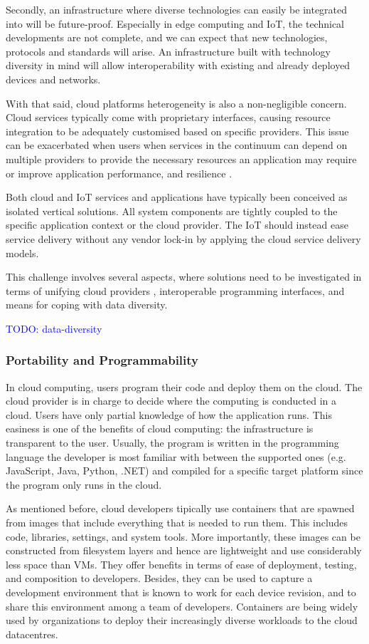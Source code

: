 \documentclass{ieeeaccess}
\begin{document}
Secondly, an infrastructure where diverse technologies can easily be integrated into will be future-proof. Especially in edge computing and IoT, the technical developments are not complete, and we can expect that new technologies, protocols and standards will arise. An infrastructure built with technology diversity in mind will allow interoperability with existing and already deployed devices and networks.

With that said, cloud platforms heterogeneity is also a non-negligible concern. Cloud services typically come with proprietary interfaces, causing resource integration to be adequately customised based on specific providers. This issue can be exacerbated when users when services in the continuum can depend on multiple providers to provide the necessary resources an application may require or improve application performance, and resilience \cite{cloud-iot}.

Both cloud and IoT services and applications have typically been conceived as isolated vertical solutions. All system components are tightly coupled to the specific application context or the cloud provider. The IoT should instead ease service delivery without any vendor lock-in by applying the cloud service delivery models.

This challenge involves several aspects, where solutions need to be investigated in terms of unifying cloud providers \cite{inter-cloud}, interoperable programming interfaces, and means for coping with data diversity.

\textcolor{blue}{TODO: data-diversity}

\subsubsection{Portability and Programmability}

In cloud computing, users program their code and deploy them on the cloud. The cloud provider is in charge to decide where the computing is conducted in a cloud. Users have only partial knowledge of how the application runs. This easiness is one of the benefits of cloud computing: the infrastructure is transparent to the user. Usually, the program is written in the programming language the developer is most familiar with between the supported ones (e.g. JavaScript, Java, Python, .NET) and compiled for a specific target platform since the program only runs in the cloud.

As mentioned before, cloud developers tipically use containers that are spawned from images that include everything that is needed to run them. This includes code, libraries, settings, and system tools. More importantly, these images can be constructed from filesystem layers and hence are lightweight and use considerably less space than VMs. They offer benefits in terms of ease of deployment, testing, and composition to developers. Besides, they can be used to capture a development environment that is known to work for each device revision, and to share this environment among a team of developers. Containers are being widely used by organizations to deploy their increasingly diverse workloads to the cloud datacentres.
\end{document}
